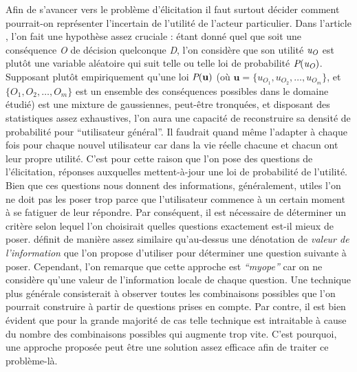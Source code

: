 \documentclass[a4paper,11pt]{article}
\theoremstyle{plain}
\begin{document}
Afin de s'avancer vers le problème d'élicitation il faut surtout décider comment pourrait-on représenter l'incertain de l'utilité de l'acteur particulier. Dans l’article \cite{chajewska_making_2000}, l’on fait une hypothèse assez cruciale : étant donné quel que soit une conséquence \emph{O} de décision quelconque \emph{D}, l’on considère que son utilité $\emph{u}_\emph{O}$ est plutôt une variable aléatoire qui suit telle ou telle loi de probabilité $\emph{P}(\emph{u}_\emph{O})$. Supposant plutôt empiriquement qu’une loi $\emph{P}(\textbf{u})$ (où $\textbf{u} = \{u_{O_1}, u_{O_2}, \dotsc, u_{O_m}\}$, et $\{O_1, O_2, \dotsc, O_m\}$ est un ensemble des conséquences possibles dans le domaine étudié) est une mixture de gaussiennes, peut-être tronquées, et disposant des statistiques assez exhaustives, l’on aura une capacité de reconstruire sa densité de probabilité pour ``utilisateur général''. Il faudrait quand même l’adapter à chaque fois pour chaque nouvel utilisateur car dans la vie réelle chacune et chacun ont leur propre utilité. C’est pour cette raison que l’on pose des questions de l’élicitation, réponses auxquelles mettent-à-jour une loi de probabilité de l’utilité. Bien que ces questions nous donnent des informations, généralement, utiles l’on ne doit pas les poser trop parce que l’utilisateur commence à un certain moment à se fatiguer de leur répondre. Par conséquent, il est nécessaire de déterminer un critère selon lequel l’on choisirait quelles questions exactement est-il mieux de poser. \cite{chajewska_making_2000} définit de manière assez similaire qu'au-dessus une dénotation de \emph{valeur de l’information} que l’on propose d’utiliser pour déterminer une question suivante à poser. Cependant, l’on remarque que cette approche est \emph{``myope''} car on ne considère qu’une valeur de l’information locale de chaque question. Une technique plus générale consisterait à observer toutes les combinaisons possibles que l’on pourrait construire à partir de questions prises en compte. Par contre, il est bien évident que pour la grande majorité de cas telle technique est intraitable à cause du nombre des combinaisons possibles qui augmente trop vite. C’est pourquoi, une approche proposée peut être une solution assez efficace afin de traiter ce problème-là.
\end{document}
